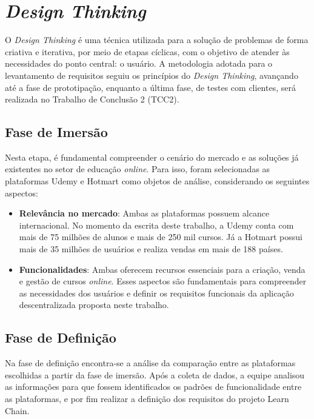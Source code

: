 \section{\textit{Design Thinking}}

O \textit{Design Thinking} é uma técnica utilizada para a solução de problemas de forma criativa e iterativa, por meio de etapas cíclicas, com o objetivo de atender às necessidades do ponto central: o usuário. A metodologia adotada para o levantamento de requisitos seguiu os princípios do \textit{Design Thinking}, avançando até a fase de prototipação, enquanto a última fase, de testes com clientes, será realizada no Trabalho de Conclusão 2 (TCC2).

    \subsection{Fase de Imersão}
    Nesta etapa, é fundamental compreender o cenário do mercado e as soluções já existentes no setor de educação \textit{online}. Para isso, foram selecionadas as plataformas Udemy e Hotmart como objetos de análise, considerando os seguintes aspectos:

        \begin{itemize}
            \item \textbf{Relevância no mercado}: Ambas as plataformas possuem alcance internacional. No momento da escrita deste trabalho, a Udemy conta com mais de 75 milhões de alunos e mais de 250 mil cursos. Já a Hotmart possui mais de 35 milhões de usuários e realiza vendas em mais de 188 países.
            \item \textbf{Funcionalidades}: Ambas oferecem recursos essenciais para a criação, venda e gestão de cursos \textit{online}. Esses aspectos são fundamentais para compreender as necessidades dos usuários e definir os requisitos funcionais da aplicação descentralizada proposta neste trabalho.
        \end{itemize}

    \subsection{Fase de Definição}
        Na fase de definição encontra-se a análise da comparação entre as plataformas escolhidas a partir da fase de imersão. Após a coleta de dados, a equipe analisou as informações para que fossem identificados os padrões de funcionalidade entre as plataformas, e por fim realizar a definição dos requisitos do projeto Learn Chain.

